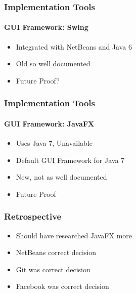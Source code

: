 \begin{frame}
  \frametitle{Implementation Tools}
  \framesubtitle{GUI Framework: Swing}
  \begin{itemize}
  \item{Integrated with NetBeans and Java 6}
  \item{Old so well documented}
  \item{Future Proof?}
  \end{itemize}
\end{frame}

\begin{frame}
  \frametitle{Implementation Tools}
  \framesubtitle{GUI Framework: JavaFX}
  \begin{itemize}
    \item{Uses Java 7, Unavailable}
    \item{Default GUI Framework for Java 7}
    \item{New, not as well documented}
    \item{Future Proof}
  \end{itemize}
\end{frame}

\begin{frame}
  \frametitle{Retrospective}
  \begin{itemize}
    \item{Should have researched JavaFX more}
    \item{NetBeans correct decision}
    \item{Git was correct decision}
    \item{Facebook was correct decision}
  \end{itemize}
\end{frame}